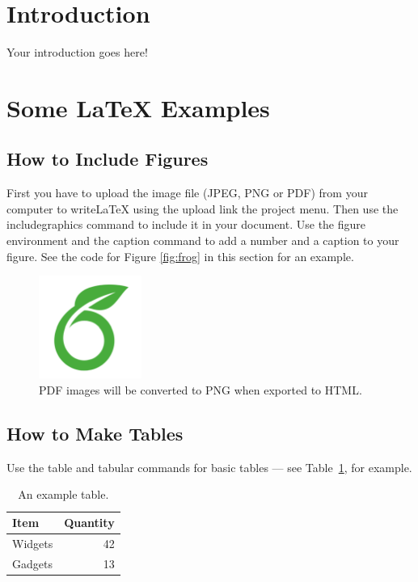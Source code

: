 
\section{Introduction}

Your introduction goes here! 

\section{Some \LaTeX{} Examples}
\label{sec:examples}

\subsection{How to Include Figures}

First you have to upload the image file (JPEG, PNG or PDF) from your computer to writeLaTeX using the upload link the project menu. Then use the includegraphics command to include it in your document. Use the figure environment and the caption command to add a number and a caption to your figure. See the code for Figure \ref{fig:frog} in this section for an example.



\begin{figure}
\centering
\includegraphics[width=0.3\textwidth]{overleaf}
\caption{PDF images will be converted to PNG when exported to HTML.}
\end{figure}

\subsection{How to Make Tables}

Use the table and tabular commands for basic tables --- see Table~\ref{tab:widgets}, for example.

\begin{table}
\centering
\begin{tabular}{l|r}
Item & Quantity \\\hline
Widgets & 42 \\
Gadgets & 13
\end{tabular}
\caption{\label{tab:widgets}An example table.}
\end{table}

